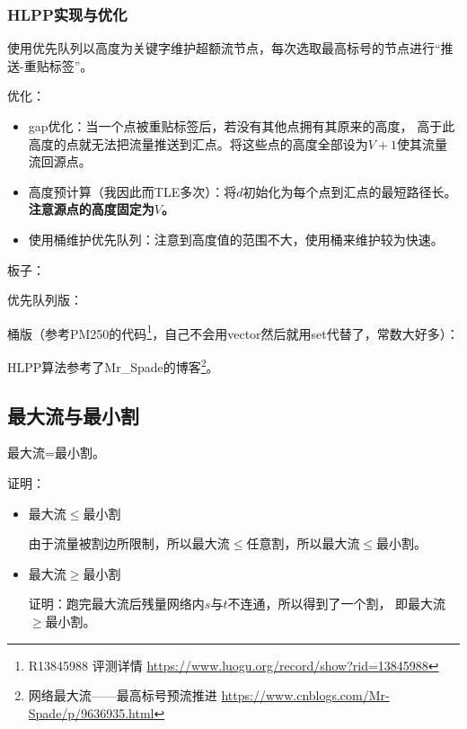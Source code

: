 \subsubsection{HLPP实现与优化}

使用优先队列以高度为关键字维护超额流节点，每次选取最高标号的节点进行``推送-重贴标签''。

优化：
\begin{itemize}
	\item gap优化：当一个点被重贴标签后，若没有其他点拥有其原来的高度，
	高于此高度的点就无法把流量推送到汇点。将这些点的高度全部设为$V+1$使其流量
	流回源点。
	\item 高度预计算（我因此而TLE多次）：将$d$初始化为每个点到汇点的最短路径长。
	{\bfseries 注意源点的高度固定为$V$。}
	\item 使用桶维护优先队列：注意到高度值的范围不大，使用桶来维护较为快速。
\end{itemize}

板子：

优先队列版：


桶版（参考PM250的代码\footnote{
	R13845988 评测详情
	\url{https://www.luogu.org/record/show?rid=13845988}
}，自己不会用vector然后就用set代替了，常数大好多）：


HLPP算法参考了Mr\_Spade的博客\footnote{
	网络最大流——最高标号预流推进
	\url{https://www.cnblogs.com/Mr-Spade/p/9636935.html}
}。

\subsection{最大流与最小割}

\begin{theorem}\label{MFMCT}
	最大流=最小割。
\end{theorem}

证明：
\begin{itemize}
	\item
	\begin{lemma}\label{MCA}
		最大流$\leq$最小割
	\end{lemma}
	由于流量被割边所限制，所以最大流$\leq$任意割，所以最大流$\leq$最小割。
	\item
	\begin{lemma}\label{MCB}
		最大流$\geq$最小割
	\end{lemma}
	证明：跑完最大流后残量网络内$s$与$t$不连通，所以得到了一个割，
	即最大流$\geq$最小割。
\end{itemize}

